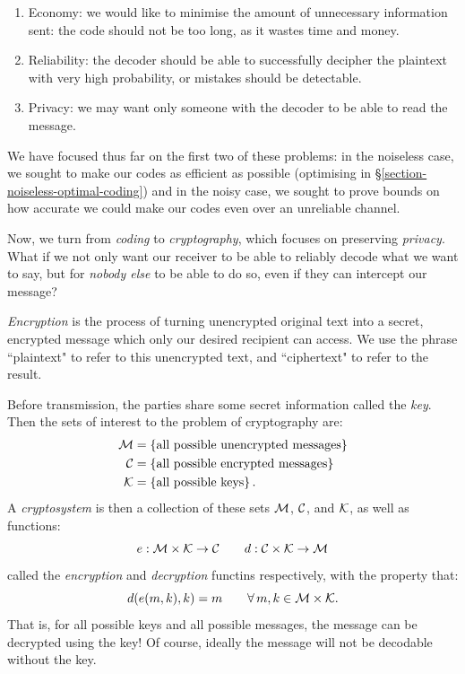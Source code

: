 \documentclass{article}
\begin{document}
\begin{enumerate}
    \item Economy: we would like to minimise the amount of unnecessary information sent: the code should not be too long, as it wastes time and money.
    \item Reliability: the decoder should be able to successfully decipher the plaintext with very high probability, or mistakes should be detectable.
    \item Privacy: we may want only someone with the decoder to be able to read the message.
\end{enumerate}

We have focused thus far on the first two of these problems: in the noiseless case, we sought to make our codes as efficient as possible (optimising in \S\ref{section-noiseless-optimal-coding}) and in the noisy case, we sought to prove bounds on how accurate we could make our codes even over an unreliable channel.

Now, we turn from \textit{coding} to \textit{cryptography}, which focuses on preserving \textit{privacy}. What if we not only want our receiver to be able to reliably decode what we want to say, but for \textit{nobody else} to be able to do so, even if they can intercept our message?

\begin{definition}[Cryptosystem]
	\label{cryptosystem}
	\textit{Encryption} is the process of turning unencrypted original text into a secret, encrypted message which only our desired recipient can access.
    We use the phrase ``plaintext" to refer to this unencrypted text, and ``ciphertext" to refer to the result.
    
    Before transmission, the parties share some secret information called the \textit{key}. Then the sets of interest to the problem of cryptography are:
    \begin{align*}
		\mathcal{M} &= \left\lbrace \text{all possible unencrypted messages} \right\rbrace \\
		\mathcal{C} &= \left\lbrace \text{all possible encrypted messages} \right\rbrace \\
		\mathcal{K} &= \left\lbrace \text{all possible keys} \right\rbrace.
	\end{align*}
    A \textit{cryptosystem} is then a collection of these sets $\mathcal{M}$, $\mathcal{C}$, and $\mathcal{K}$, as well as functions:
    \[
	e: \mathcal{M} \times \mathcal{K} \to \mathcal{C}
	\qquad
	d: \mathcal{C} \times \mathcal{K} \to \mathcal{M}
	\]
	called the \textit{encryption} and \textit{decryption} functins respectively, with the property that:
	\[
	d(e(m, k), k) = m \qquad \forall \, m,k \in \mathcal{M} \times \mathcal{K}.
	\]
	That is, for all possible keys and all possible messages, the message can be decrypted using the key! Of course, ideally the message will not be decodable without the key.
\end{definition}
\end{document}
